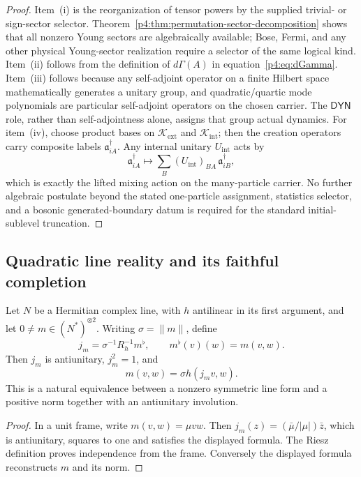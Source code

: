 \documentclass[12pt,a4paper]{article}
\begin{document}
\begin{proof}
Item~(i) is the reorganization of tensor powers by the supplied trivial- or
sign-sector selector.  Theorem~\ref{p4:thm:permutation-sector-decomposition}
shows that all nonzero Young sectors are algebraically available; Bose, Fermi,
and any other physical Young-sector realization require a selector of the same
logical kind.
Item~(ii) follows from the definition of $d\Gamma(A)$ in equation~\eqref{p4:eq:dGamma}.
Item~(iii) follows because any self-adjoint operator on a finite Hilbert
space mathematically generates a unitary group, and quadratic/quartic mode
polynomials are particular self-adjoint operators on the chosen carrier.
The \(\mathsf{DYN}\) role, rather than self-adjointness alone, assigns that
group actual dynamics.
For item~(iv), choose product bases on $\mathcal K_{\mathrm{ext}}$ and $\mathcal K_{\mathrm{int}}$; then the creation operators carry composite labels $\mathfrak a_{iA}^\dagger$.
Any internal unitary $U_{\mathrm{int}}$ acts by
\[
\mathfrak a_{iA}^\dagger
\mapsto
\sum_B (U_{\mathrm{int}})_{BA}\,\mathfrak a_{iB}^\dagger,
\]
which is exactly the lifted mixing action on the many-particle carrier.
No further algebraic postulate beyond the stated one-particle assignment,
statistics selector, and a bosonic generated-boundary datum is required for the standard initial-sublevel truncation.
\end{proof}




\subsection{Quadratic line reality and its faithful completion}

\begin{proposition}
\label{p4:prop:quadratic-line-reality}
Let \(N\) be a Hermitian complex line, with \(h\) antilinear in
its first argument, and let \(0\ne m\in(N^*)^{\otimes2}\).
Writing \(\sigma=\|m\|\), define
\[
 j_m=\sigma^{-1}R_h^{-1}m^\flat,\qquad
 m^\flat(v)(w)=m(v,w).
\]
Then \(j_m\) is antiunitary, \(j_m^2=1\), and
\[
 m(v,w)=\sigma h(j_mv,w).
\]
This is a natural equivalence between a nonzero symmetric line
form and a positive norm together with an antiunitary involution.
\end{proposition}
\begin{proof}
In a unit frame, write \(m(v,w)=\mu vw\).
Then \(j_m(z)=(\bar\mu/|\mu|)\bar z\), which is antiunitary,
squares to one and satisfies the displayed formula.  The
Riesz definition proves independence from the frame.  Conversely
the displayed formula reconstructs \(m\) and its norm.
\end{proof}
\end{document}
